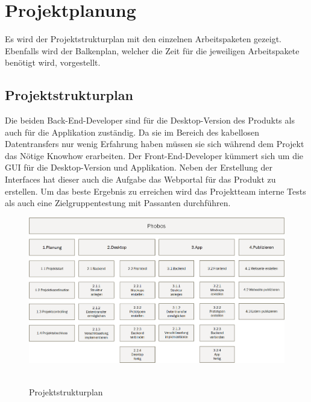 \newpage
\section{Projektplanung}
Es wird der Projektstrukturplan mit den einzelnen Arbeitspaketen gezeigt. Ebenfalls wird der Balkenplan, welcher die Zeit für die jeweiligen Arbeitspakete benötigt wird, vorgestellt.
\subsection{Projektstrukturplan}
Die beiden Back-End-Developer sind für die Desktop-Version des Produkts als auch für die Applikation zuständig. Da sie   im Bereich des kabellosen Datentransfers nur wenig Erfahrung haben müssen sie sich während dem Projekt das Nötige Knowhow erarbeiten. Der Front-End-Developer kümmert sich um die GUI für die Desktop-Version und Applikation. Neben der Erstellung der Interfaces hat dieser auch die Aufgabe das Webportal für das Produkt zu erstellen. Um das beste Ergebnis zu erreichen wird das Projektteam interne Tests als auch eine Zielgruppentestung mit Passanten durchführen.\\
\begin{figure}[H]
	\centering
	\includegraphics[width=\linewidth]{pictures/8.Projektorganisation/psp.png}\
	\caption{Projektstrukturplan}
\end{figure}
\newpage
